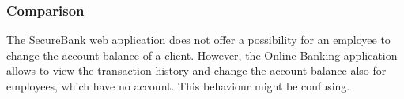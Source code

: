 \subsubsection*{Comparison}
The SecureBank web application does not offer a possibility for an employee to change the account balance of a client. However, the Online Banking application allows to view the transaction history and change the account balance also for employees, which have no account. This behaviour might be confusing.

\clearpage


